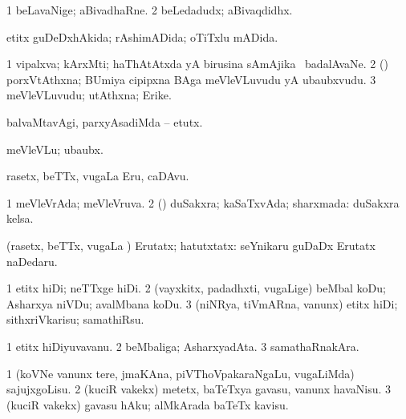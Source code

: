 {{\bentry
{} 
\gl{\nA}
\expl{}
\bmng
\bnum
\num{1} beLavaNige; aBivadhaRne. 
\num{2} beLedadudx; aBivaqdidhx. 
\enum
\emng
\eentry

\bentry
{} 
\gl{\gu}
\expl{}
\bmng
etitx guDeDxhAkida; rAshimADida; oTiTxlu mADida. 
\emng
\eentry

\bentry
{} 
\gl{\nA}
\expl{}
\bmng
\bnum
\num{1} vipalxva; kArxMti; haThAtAtxda yA birusina sAmAjika \mo\ badalAvaNe. 
\num{2} (\BUvi) porxVtAthxna; BUmiya cipipxna BAga meVleVLuvudu yA ubaubxvudu. 
\num{3} meVleVLuvudu; utAthxna; Erike. 
\enum
\emng
\eentry

\bentry
{} 
\gl{\akirx}
\expl{}
\bmng
balvaMtavAgi, parxyAsadiMda -- etutx. 
\emng

\noindent
\gl{\akirx}
\expl{}
\bmng
meVleVLu; ubaubx. 
\emng
\eentry

\bentry
{} 
\gl{\nA}
\expl{}
\bmng
rasetx, beTTx, \mo vugaLa Eru, caDAvu. 
\emng
\eentry

\bentry
{} 
\gl{\gu}
\expl{}
\bmng
\bnum
\num{1} meVleVrAda; meVleVruva. 
\num{2} (\rUpa) duSakxra; kaSaTxvAda; sharxmada:  duSakxra kelsa. 
\enum
\emng
\eentry

\bentry
{} 
\gl{\kirxvi}
\expl{}
\bmng
(rasetx, beTTx, \mo vugaLa \vi) Erutatx; hatutxtatx:  seYnikaru guDaDx Erutatx naDedaru. 
\emng
\eentry

\bentry
{} 
\gl{\sakirx}
\bmng
\bnum
\num{1} etitx hiDi; neTTxge hiDi. 
\num{2} (vayxkitx, padadhxti, \mo vugaLige) beMbal koDu; Asharxya niVDu; avalMbana koDu. 
\num{3} (niNRya, tiVmARna, \mo vanunx) etitx hiDi; sithxriVkarisu; samathiRsu. 
\enum
\emng
\eentry

\bentry
{} 
\gl{\nA}
\expl{}
\bmng
\bnum
\num{1} etitx hiDiyuvavanu. 
\num{2} beMbaliga; AsharxyadAta. 
\num{3} samathaRnakAra. 
\enum
\emng
\eentry

\bentry
{} 
\gl{\sakirx}
\expl{}
\bmng
\bnum
\num{1} (koVNe \mo vanunx tere, jmaKAna, piVThoVpakaraNgaLu, \mo vugaLiMda) sajujxgoLisu. 
\num{2} (kuciR \mo vakekx) metetx, baTeTxya gavasu, \mo vanunx havaNisu. 
\num{3} (kuciR \mo vakekx) gavasu hAku; alMkArada baTeTx kavisu. 
\enum
\emng

}}
